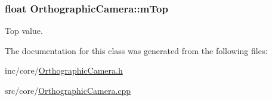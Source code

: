 \hypertarget{class_orthographic_camera_adb391b0b57fa70a2eaadd661f8ab423d}{
\subsubsection[{m\+Top}]{\setlength{\rightskip}{0pt plus 5cm}float Orthographic\+Camera\+::m\+Top\hspace{0.3cm}{\ttfamily [private]}}}\label{class_orthographic_camera_adb391b0b57fa70a2eaadd661f8ab423d}


Top value. 



The documentation for this class was generated from the following files\+:\begin{DoxyCompactItemize}
\item 
inc/core/\hyperlink{_orthographic_camera_8h}{Orthographic\+Camera.\+h}\item 
src/core/\hyperlink{_orthographic_camera_8cpp}{Orthographic\+Camera.\+cpp}\end{DoxyCompactItemize}

